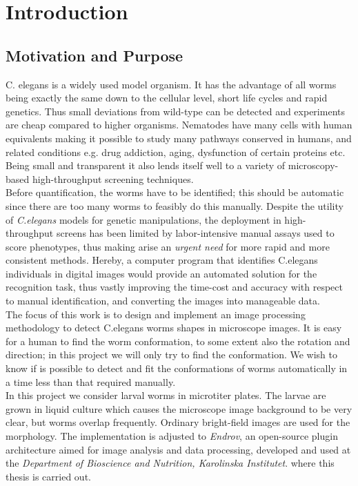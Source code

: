 \thispagestyle{empty}
\chapter{Introduction}

\section{Motivation and Purpose}
\label{sec:motivation}

C. elegans is a widely used model organism. It has the advantage of all worms 
being exactly the same down to the cellular level, short life cycles and rapid
 genetics. Thus small deviations from wild-type can be detected and experiments
 are cheap compared to higher organisms. Nematodes have many cells with human
 equivalents making it possible to study many pathways conserved in humans, 
and related conditions e.g. drug addiction, aging, dysfunction of certain
 proteins etc. Being small and transparent it also lends itself well to a 
variety of microscopy-based high-throughput screening techniques.\\
 
Before quantification, the worms have to be identified; this should be 
automatic since there are too many worms to feasibly do this manually.
Despite the utility of \emph{C.elegans} models for genetic 
manipulations, the deployment in high-throughput screens has been limited by 
labor-intensive manual assays used to score phenotypes, thus making arise
an \emph{urgent need} for more rapid and more consistent methods.
Hereby, a computer
program that identifies C.elegans individuals in digital images would 
provide an automated solution for the recognition task, thus vastly 
improving the time-cost and accuracy with respect to manual identification, 
and converting the images into manageable data.\\

The focus of this work is to design and implement an image processing
methodology to detect C.elegans worms shapes in microscope images.
It is easy for a human to find the worm conformation,
to some extent also the rotation and direction; in this project we will only 
try to find the conformation. We wish to know if is possible to detect and fit
the conformations of worms automatically in a time less than that required manually.\\

In this project we consider larval worms in microtiter plates. The larvae are 
grown in liquid culture which causes the microscope image background to be 
very clear, but worms overlap frequently. Ordinary bright-field images are 
used for the morphology. The implementation is adjusted to \emph{Endrov},
an open-source plugin architecture aimed for image analysis and data processing,
developed and used at the 
\emph{Department of Bioscience and Nutrition, Karolinska Institutet}. 
where this thesis is carried out.

